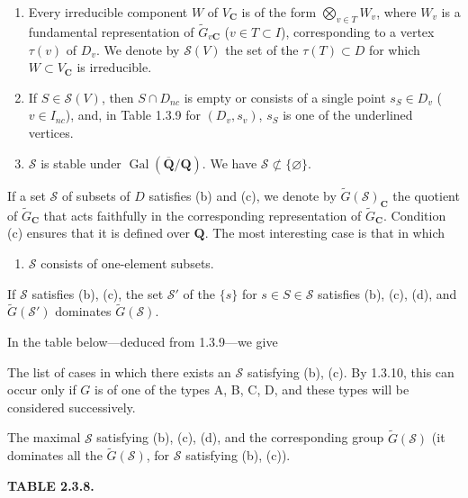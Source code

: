 \documentclass[10pt,a4paper]{article}
\providecommand{\tightlist}{\setlength{\itemsep}{0pt}\setlength{\parskip}{0pt}}
\begin{document}
\begin{enumerate}
\def\labelenumi{(\alph{enumi})}
\item
  Every irreducible component \(W\) of \(V_{\mathbf C}\) is of the form \(\bigotimes_{v\in T}W_v\), where \(W_v\) is a fundamental representation of \(\widetilde G_{v\mathbf C}\) (\(v\in T\subset I\)), corresponding to a vertex \(\tau(v)\) of \(D_v\). We denote by \(\mathscr S(V)\) the set of the \(\tau(T)\subset D\) for which \(W\subset V_{\mathbf C}\) is irreducible.
\item
  If \(S\in\mathscr S(V)\), then \(S\cap D_{nc}\) is empty or consists of a single point \(s_S\in D_v\) (\(v\in I_{nc}\)), and, in Table 1.3.9 for \((D_v,s_v)\), \(s_S\) is one of the underlined vertices.
\item
  \(\mathscr S\) is stable under \(\operatorname{Gal}(\overline{\mathbf Q}/\mathbf Q)\). We have \(\mathscr S\not\subset\{\varnothing\}\).
\end{enumerate}

If a set \(\mathscr S\) of subsets of \(D\) satisfies (b) and (c), we denote by \(\widetilde G(\mathscr S)_{\mathbf C}\) the quotient of \(\widetilde G_{\mathbf C}\) that acts faithfully in the corresponding representation of \(\widetilde G_{\mathbf C}\). Condition (c) ensures that it is defined over \(\mathbf Q\). The most interesting case is that in which

\begin{enumerate}
\def\labelenumi{(\alph{enumi})}
\setcounter{enumi}{3}
\tightlist
\item
  \(\mathscr S\) consists of one-element subsets.
\end{enumerate}

If \(\mathscr S\) satisfies (b), (c), the set \(\mathscr S'\) of the \(\{s\}\) for \(s\in S\in\mathscr S\) satisfies (b), (c), (d), and \(\widetilde G(\mathscr S')\) dominates \(\widetilde G(\mathscr S)\).

In the table below---deduced from 1.3.9---we give

The list of cases in which there exists an \(\mathscr S\) satisfying (b), (c). By 1.3.10, this can occur only if \(G\) is of one of the types A, B, C, D, and these types will be considered successively.

The maximal \(\mathscr S\) satisfying (b), (c), (d), and the corresponding group \(\widetilde G(\mathscr S)\) (it dominates all the \(\widetilde G(\mathscr S)\), for \(\mathscr S\) satisfying (b), (c)).

\textbf{TABLE 2.3.8.}
\end{document}
